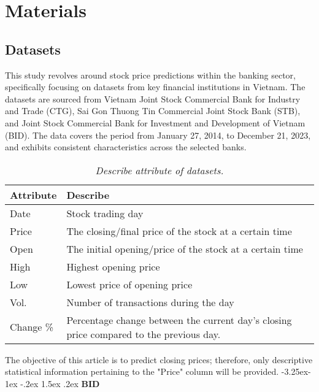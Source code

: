 \documentclass{ieeeojies}
\makeatletter
\renewcommand\subsubsection{\@startsection{subsubsection}{3}{\z@}%
                                   {-3.25ex\@plus -1ex \@minus -.2ex}%
                                   {1.5ex \@plus .2ex}%
                                   {\normalfont\normalsize\bfseries}}
\makeatother
\begin{document}
\section{\centering Materials}
\subsection{Datasets}
\hspace{0.3cm}This study revolves around stock price predictions within the banking sector, specifically focusing on datasets from key financial institutions in Vietnam. The datasets are sourced from Vietnam Joint Stock Commercial Bank for Industry and Trade (CTG), Sai Gon Thuong Tin Commercial Joint Stock Bank (STB), and Joint Stock Commercial Bank for Investment and Development of Vietnam (BID). The data covers the period from January 27, 2014, to December 21, 2023, and exhibits consistent characteristics across the selected banks.

\begin{table}[h]
    \centering
    \begin{tabular}{|l|p{6cm}|}
        \hline
        \textbf{Attribute} & \textbf{Describe} \\
        \hline
        Date & Stock trading day \\
        \hline
        Price & The closing/final price of the stock at a certain time \\
        \hline
        Open & The initial opening/price of the stock at a certain time \\
        \hline
        High & Highest opening price \\
        \hline
        Low & Lowest price of opening price \\
        \hline
        Vol. & Number of transactions during the day \\
        \hline
        Change \% & Percentage change between the current day's closing price compared to the previous day. \\
        \hline
    \end{tabular}
    \caption{\centering \textit{Describe attribute of datasets.}}
    \label{tab:my_label}
\end{table}
\vspace{-0.5\baselineskip}
The objective of this article is to predict closing prices; therefore, only descriptive statistical information pertaining to the "Price" column will be provided.
\vspace{-1\baselineskip}
\subsubsection{\textbf{BID}}
\end{document}
